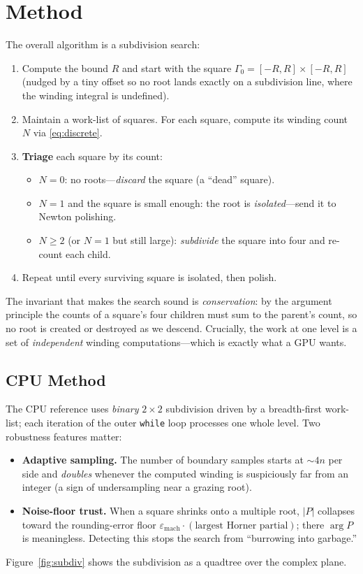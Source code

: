 \documentclass[11pt]{article}
\begin{document}
\section{Method}
\label{sec:method}
The overall algorithm is a subdivision search:

\begin{enumerate}
  \item Compute the bound $R$ and start with the square $\Gamma_0 =
        [-R,R]\times[-R,R]$ (nudged by a tiny offset so no root lands exactly on
        a subdivision line, where the winding integral is undefined).
  \item Maintain a work-list of squares. For each square, compute its winding
        count $N$ via \eqref{eq:discrete}.
  \item \textbf{Triage} each square by its count:
    \begin{itemize}
      \item $N = 0$: no roots---\emph{discard} the square (a ``dead'' square).
      \item $N = 1$ and the square is small enough: the root is
        \emph{isolated}---send it to Newton polishing.
      \item $N \ge 2$ (or $N=1$ but still large): \emph{subdivide} the square
        into four and re-count each child.
    \end{itemize}
  \item Repeat until every surviving square is isolated, then polish.
\end{enumerate}

The invariant that makes the search sound is \emph{conservation}: by the
argument principle the counts of a square's four children must sum to the
parent's count, so no root is created or destroyed as we descend. Crucially, the
work at one level is a set of \emph{independent} winding computations---which is
exactly what a GPU wants.

\subsection{CPU Method}
The CPU reference uses \emph{binary} $2\times2$ subdivision driven by a
breadth-first work-list; each iteration of the outer \texttt{while} loop
processes one whole level. Two robustness features matter:
\begin{itemize}
  \item \textbf{Adaptive sampling.} The number of boundary samples starts at
    ${\sim}4n$ per side and \emph{doubles} whenever the computed winding is
    suspiciously far from an integer (a sign of undersampling near a grazing
    root).
  \item \textbf{Noise-floor trust.} When a square shrinks onto a multiple root,
    $|P|$ collapses toward the rounding-error floor $\varepsilon_{\text{mach}}
    \cdot (\text{largest Horner partial})$; there $\arg P$ is meaningless.
    Detecting this stops the search from ``burrowing into garbage.''
\end{itemize}
Figure~\ref{fig:subdiv} shows the subdivision as a quadtree over the complex
plane.
\end{document}
